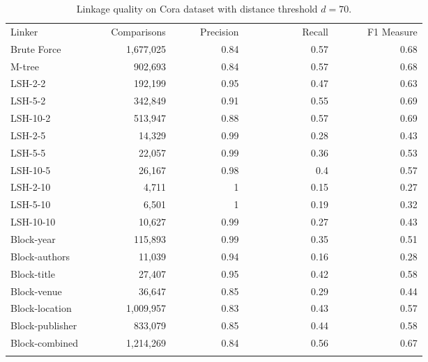 \documentclass{llncs}
\begin{document}
\begin{table}[ht]
\caption{Linkage quality on Cora dataset with distance threshold
  $d= 70$.}
  \label{comparison-of-results-cora}
  \centering
  \begin{footnotesize}
  \begin{tabular}{lrrrr} \hline\noalign{\smallskip}
  Linker~~~~~~~~~~ & ~~~Comparisons & ~~~~~Precision & 
  ~~~~~~~~~~~Recall & ~~~~~~F1 Measure \\
  \noalign{\smallskip} \hline \noalign{\smallskip}
Brute Force        & 1,677,025                 & 0.84      & 0.57   & 0.68  \\
\noalign{\smallskip} \hline \noalign{\smallskip}
M-tree              &  902,693                  & 0.84      & 0.57   & 0.68       \\
\noalign{\smallskip} \hline \noalign{\smallskip}
LSH-2-2            &  192,199	& 0.95	& 0.47	& 0.63       \\
LSH-5-2            &  342,849	& 0.91	& 0.55	& 0.69       \\
LSH-10-2           &  513,947	& 0.88	& 0.57	& 0.69       \\
LSH-2-5            &  14,329	& 0.99	& 0.28	& 0.43      \\
LSH-5-5            &  22,057	& 0.99	& 0.36	& 0.53       \\
LSH-10-5           &  26,167	& 0.98	& 0.4	& 0.57      \\
LSH-2-10           &  4,711	& 1	& 0.15	& 0.27    \\
LSH-5-10           &  6,501	& 1	& 0.19	& 0.32      \\
LSH-10-10          & 10,627  	& 0.99	& 0.27& 	0.43       \\
\noalign{\smallskip} \hline \noalign{\smallskip}
Block-year         &  115,893                  & 0.99      & 0.35   & 0.51       \\
Block-authors      &   11,039                   & 0.94      & 0.16   & 0.28       \\
Block-title        &   27,407                   & 0.95      & 0.42   & 0.58       \\
Block-venue        &   36,647                   & 0.85      & 0.29   & 0.44       \\
Block-location     & 1,009,957                 & 0.83      & 0.43   & 0.57       \\
Block-publisher    &  833,079                  & 0.85      & 0.44   & 0.58       \\
Block-combined     & 1,214,269                 & 0.84      & 0.56   & 0.67       \\
\noalign{\smallskip} \hline
\end{tabular}
\end{footnotesize}
\end{table}
\end{document}
